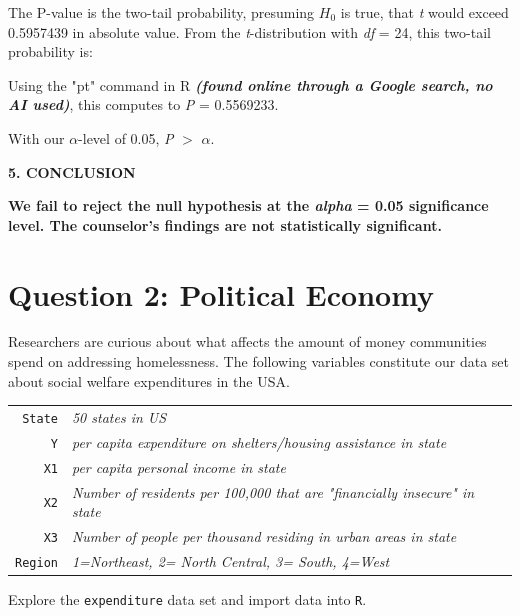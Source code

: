 \documentclass[12pt,letterpaper]{article}
\begin{document}
\begin{enumerate}
		The P-value is the two-tail probability,  presuming $H_0$ is true, that \textit{t} would exceed 0.5957439 in absolute value.  From the \textit{t}-distribution with \textit{df} = 24, this two-tail probability is:
		
		
		
		Using the "pt" command in R \textbf{\textit{(found online through a Google search, no AI  used)}}, this computes to \textit{P} = 0.5569233.
		
		With our $\alpha$-level of 0.05, \textit{P} $>$ $\alpha$. 
		
		\textbf{5. CONCLUSION}
		
		\textbf{We fail to reject the null hypothesis at the \textit{alpha} = 0.05 significance level. The counselor's findings are not statistically significant. }
	\end{enumerate}
	
	\newpage
	
	\section*{Question 2: Political Economy}
	
	\noindent Researchers are curious about what affects the amount of money communities spend on addressing homelessness. The following variables constitute our data set about social welfare expenditures in the USA. \\
	\vspace{.5cm}
	
	
	\begin{tabular}{r|l}
		\texttt{State} &\emph{50 states in US} \\
		\texttt{Y} & \emph{per capita expenditure on shelters/housing assistance in state}\\
		\texttt{X1} &\emph{per capita personal income in state} \\
		\texttt{X2} &  \emph{Number of residents per 100,000 that are "financially insecure" in state}\\
		\texttt{X3} &  \emph{Number of people per thousand residing in urban areas in state} \\
		\texttt{Region} &  \emph{1=Northeast, 2= North Central, 3= South, 4=West} \\
	\end{tabular}
	
	\vspace{.5cm}
	\noindent Explore the \texttt{expenditure} data set and import data into \texttt{R}.
	\vspace{.5cm}
	
\end{document}
